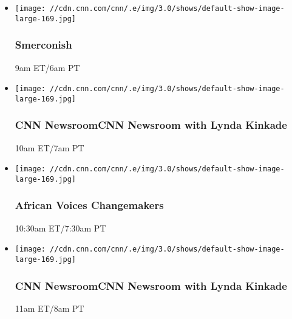 \begin{itemize}
\item
  \texttt{[image: //cdn.cnn.com/cnn/.e/img/3.0/shows/default-show-image-large-169.jpg]}

  \hypertarget{smerconish}{%
  \subsubsection{Smerconish}\label{smerconish}}

  9am ET/6am PT
\end{itemize}

\begin{itemize}
\item
  \texttt{[image: //cdn.cnn.com/cnn/.e/img/3.0/shows/default-show-image-large-169.jpg]}

  \hypertarget{cnn-newsroomcnn-newsroom-with-lynda-kinkade-}{%
  \subsubsection{CNN NewsroomCNN Newsroom with Lynda Kinkade
  }\label{cnn-newsroomcnn-newsroom-with-lynda-kinkade-}}

  10am ET/7am PT
\end{itemize}

\begin{itemize}
\item
  \texttt{[image: //cdn.cnn.com/cnn/.e/img/3.0/shows/default-show-image-large-169.jpg]}

  \hypertarget{african-voices-changemakers-1}{%
  \subsubsection{African Voices
  Changemakers}\label{african-voices-changemakers-1}}

  10:30am ET/7:30am PT
\end{itemize}

\begin{itemize}
\item
  \texttt{[image: //cdn.cnn.com/cnn/.e/img/3.0/shows/default-show-image-large-169.jpg]}

  \hypertarget{cnn-newsroomcnn-newsroom-with-lynda-kinkade--1}{%
  \subsubsection{CNN NewsroomCNN Newsroom with Lynda Kinkade
  }\label{cnn-newsroomcnn-newsroom-with-lynda-kinkade--1}}

  11am ET/8am PT
\end{itemize}

